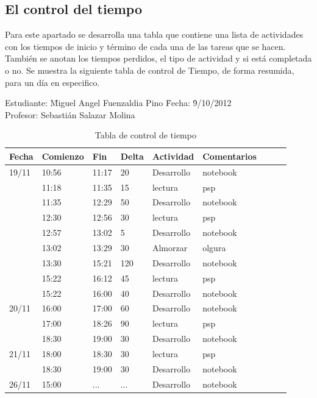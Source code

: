 \documentclass[a4paper,12pt,openany,oneside]{book}
\begin{document}
\subsection{El control del tiempo}
Para este apartado se desarrolla una tabla que contiene una lista de actividades con los tiempos de inicio y término de cada una de las tareas que se hacen. También se anotan los tiempos perdidos, el tipo de actividad y si está completada o no. Se muestra la siguiente tabla de control de Tiempo, de forma resumida, para un día en especifico.
\newpage
\begin{table}[!ht]
\begin{tabbing}
Estudiante: \= Miguel Angel Fuenzaldia Pino \= Fecha: \= 9/10/2012\\
Profesor: \> Sebastián Salazar Molina \>   \>  \\
\end{tabbing}
\begin{tabular}{| l | l | l | l | l | l | l | l | l |}
\hline
\textbf{Fecha} & \textbf{Comienzo} & \textbf{Fin} & \textbf{Delta} & \textbf{Actividad} & \textbf{Comentarios}\\
\hline
19/11 & 10:56 & 11:17 & 20 & Desarrollo & notebook\\
\hline
      & 11:18 & 11:35 & 15 & lectura & psp\\
\hline
      & 11:35 & 12:29 & 50 & Desarrollo & notebook\\
\hline
      & 12:30 & 12:56 & 30 & lectura & psp\\
\hline
      & 12:57 & 13:02 & 5 & Desarrollo & notebook\\
\hline
      & 13:02 & 13:29 & 30 & Almorzar & olgura\\
\hline
      & 13:30 & 15:21 & 120 & Desarrollo & notebook\\
\hline
      & 15:22 & 16:12 & 45 & lectura & psp\\
\hline
      & 15:22 & 16:00 & 40 & Desarrollo & notebook\\
\hline   
20/11 & 16:00 & 17:00 & 60 & Desarrollo & notebook\\
\hline
      & 17:00 & 18:26 & 90 & lectura & psp\\
\hline
      & 18:30 & 19:00 & 30 & Desarrollo & notebook\\
\hline 
21/11 & 18:00 & 18:30 & 30 & lectura & psp\\
\hline
      & 18:30 & 19:00 & 30 & Desarrollo & notebook\\
\hline 
26/11 & 15:00 & ... & ... & Desarrollo & notebook\\
\hline
\end{tabular}
\caption{Tabla de control de tiempo}
\end{table}
\end{document}
